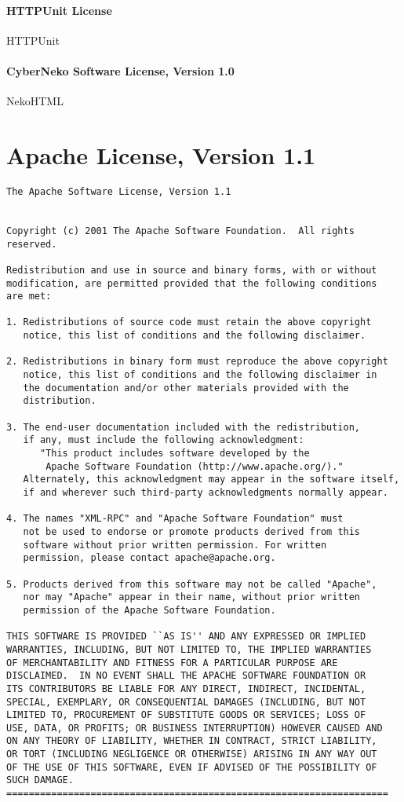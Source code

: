 \documentclass{InsightBook}
\begin{document}
\paragraph{HTTPUnit License}
HTTPUnit

\paragraph{CyberNeko Software License, Version 1.0}
NekoHTML


\section{Apache License, Version 1.1}
\begin{verbatim}
The Apache Software License, Version 1.1


Copyright (c) 2001 The Apache Software Foundation.  All rights
reserved.

Redistribution and use in source and binary forms, with or without
modification, are permitted provided that the following conditions
are met:

1. Redistributions of source code must retain the above copyright
   notice, this list of conditions and the following disclaimer.

2. Redistributions in binary form must reproduce the above copyright
   notice, this list of conditions and the following disclaimer in
   the documentation and/or other materials provided with the
   distribution.

3. The end-user documentation included with the redistribution,
   if any, must include the following acknowledgment:
      "This product includes software developed by the
       Apache Software Foundation (http://www.apache.org/)."
   Alternately, this acknowledgment may appear in the software itself,
   if and wherever such third-party acknowledgments normally appear.

4. The names "XML-RPC" and "Apache Software Foundation" must
   not be used to endorse or promote products derived from this
   software without prior written permission. For written
   permission, please contact apache@apache.org.

5. Products derived from this software may not be called "Apache",
   nor may "Apache" appear in their name, without prior written
   permission of the Apache Software Foundation.

THIS SOFTWARE IS PROVIDED ``AS IS'' AND ANY EXPRESSED OR IMPLIED
WARRANTIES, INCLUDING, BUT NOT LIMITED TO, THE IMPLIED WARRANTIES
OF MERCHANTABILITY AND FITNESS FOR A PARTICULAR PURPOSE ARE
DISCLAIMED.  IN NO EVENT SHALL THE APACHE SOFTWARE FOUNDATION OR
ITS CONTRIBUTORS BE LIABLE FOR ANY DIRECT, INDIRECT, INCIDENTAL,
SPECIAL, EXEMPLARY, OR CONSEQUENTIAL DAMAGES (INCLUDING, BUT NOT
LIMITED TO, PROCUREMENT OF SUBSTITUTE GOODS OR SERVICES; LOSS OF
USE, DATA, OR PROFITS; OR BUSINESS INTERRUPTION) HOWEVER CAUSED AND
ON ANY THEORY OF LIABILITY, WHETHER IN CONTRACT, STRICT LIABILITY,
OR TORT (INCLUDING NEGLIGENCE OR OTHERWISE) ARISING IN ANY WAY OUT
OF THE USE OF THIS SOFTWARE, EVEN IF ADVISED OF THE POSSIBILITY OF
SUCH DAMAGE.
====================================================================


\end{verbatim}
\end{document}
